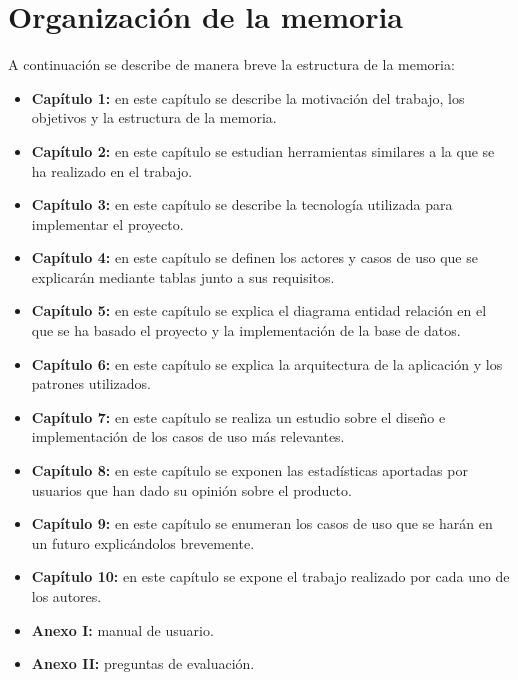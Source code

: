 \section{Organización de la memoria}
A continuación se describe de manera breve la estructura de la memoria:

\begin{itemize}
    \item \textbf{Capítulo 1:} en este capítulo se describe la motivación del trabajo, los objetivos y la estructura de la memoria.
    \item \textbf{Capítulo 2:} en este capítulo se estudian herramientas similares a la que se ha realizado en el trabajo.
    \item \textbf{Capítulo 3:} en este capítulo se describe la tecnología utilizada para implementar el proyecto.
    \item \textbf{Capítulo 4:} en este capítulo se definen los actores y casos de uso que se explicarán mediante tablas junto a sus requisitos.
    \item \textbf{Capítulo 5:} en este capítulo se explica el diagrama entidad relación en el que se ha basado el proyecto y la implementación de la base de datos.
    \item \textbf{Capítulo 6:} en este capítulo se explica la arquitectura de la aplicación y los patrones utilizados.
    \item \textbf{Capítulo 7:} en este capítulo se realiza un estudio sobre el diseño e implementación de los casos de uso más relevantes.
    \item \textbf{Capítulo 8:} en este capítulo se exponen las estadísticas aportadas por usuarios que han dado su opinión sobre el producto.
    \item \textbf{Capítulo 9:} en este capítulo se enumeran los casos de uso que se harán en un futuro explicándolos brevemente.
    \item \textbf{Capítulo 10:} en este capítulo se expone el trabajo realizado por cada uno de los autores.
    \item \textbf{Anexo I:} manual de usuario.
    \item \textbf{Anexo II:} preguntas de evaluación.

\end{itemize}
